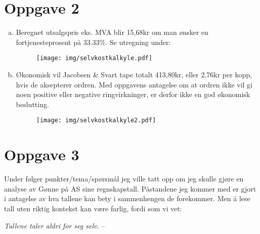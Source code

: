 \documentclass[a4paper, 12pt]{article}  %
\begin{document}
\section*{Oppgave 2}
\begin{enumerate}[(a)]
  \item Beregnet utsalgspris eks. MVA blir 15,68kr om man ønsker en fortjenesteprosent på 33.33\%. Se utregning under:
  \begin{figure}[H]
    \centering
    \texttt{[image: img/selvkostkalkyle.pdf]}
  \end{figure}

  \item Økonomisk vil Jacobsen \& Svart tape totalt 413,80kr, eller 2,76kr per kopp, hvis de aksepterer ordren. Med oppgavens antagelse om at ordren ikke vil gi noen positive eller negative ringvirkninger, er derfor ikke en god økonomisk beslutting.
  \begin{figure}[H]
    \centering
    \texttt{[image: img/selvkostkalkyle2.pdf]}
  \end{figure}
\end{enumerate}

\newpage
\section*{Oppgave 3}

Under følger punkter/tema/spørsmål jeg ville tatt opp om jeg skulle gjøre en analyse av Gønne på AS sine regnskapstall. Påstandene jeg kommer med er gjort i antagelse av hva tallene kan bety i sammenhengen de forekommer. Men å lese tall uten riktig kontekst kan være farlig, fordi som vi vet:

\begin{displayquote}
\emph{Tallene taler aldri for seg selv.}
 -- \parencite{berg19}
\end{displayquote}
\end{document}
